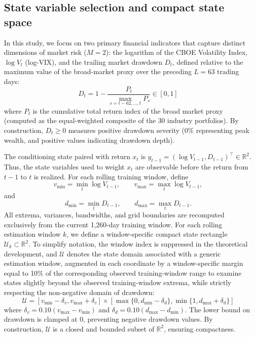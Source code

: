 \documentclass[smallextended]{svjour3}
\begin{document}
\subsection{State variable selection and compact state space}
In this study, we focus on two primary financial indicators that capture distinct dimensions of market risk ($M = 2$): the logarithm of the CBOE Volatility Index, $\log V_t$ (log-VIX), and the trailing market drawdown $D_t$, defined relative to the maximum value of
the broad-market proxy over the preceding $L=63$ trading days:
\begin{equation}
    D_t = 1 - \frac{P_t}{\max_{s=t-62,\dots,t} P_s} \in [0, 1]
\end{equation}
where $P_t$ is the cumulative total return index of the broad market proxy (computed as the equal-weighted composite of the 30 industry portfolios). By construction, $D_t \ge 0$ measures positive drawdown severity ($0\%$ representing peak wealth, and positive values indicating drawdown depth).

The conditioning state paired with return $x_t$ is
$y_{t-1}=(\log V_{t-1},D_{t-1})^\top\in\mathbb{R}^2$. Thus, the state
variables used to weight $x_t$ are observable before the return from
$t-1$ to $t$ is realized. For each rolling training window, define
\begin{equation}
v_{\min}=\min_t \log V_{t-1},\qquad v_{\max}=\max_t \log V_{t-1},
\end{equation}
and
\begin{equation}
d_{\min}=\min_t D_{t-1},\qquad d_{\max}=\max_t D_{t-1}.
\end{equation}
All extrema, variances, bandwidths, and grid boundaries are recomputed exclusively from the current 1,260-day training window. For each rolling estimation window $k$, we define a window-specific compact state rectangle $\mathcal{U}_k\subset\mathbb{R}^2$. To simplify notation, the window index is suppressed in the theoretical development, and $\mathcal{U}$ denotes the state domain associated with a generic estimation window, augmented in each coordinate by a window-specific margin equal to 10\% of
the corresponding observed training-window range to examine states slightly beyond the observed training-window extrema, while strictly respecting the non-negative domain of drawdown:
\begin{equation}
    \mathcal{U} = [v_{\min} - \delta_v, v_{\max} + \delta_v] \times [\max\{0, d_{\min} - \delta_d\}, \min\{1, d_{\max} + \delta_d\}]
\end{equation}
where $\delta_v = 0.10 (v_{\max} - v_{\min})$ and $\delta_d = 0.10 (d_{\max} - d_{\min})$. The lower bound on drawdown is clamped at 0, preventing negative drawdown values. By construction, $\mathcal{U}$ is a closed and bounded subset of $\mathbb{R}^2$, ensuring compactness.
\end{document}
